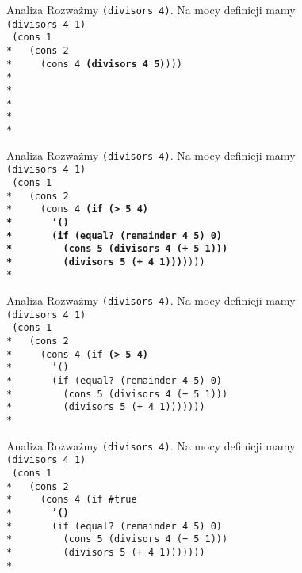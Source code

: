\begin{frame}{Analiza}
  Rozważmy \texttt{(divisors 4)}. Na mocy definicji mamy\\
  \texttt{(divisors 4 1)}\\
  \texttt{
(cons 1 \\*
\ \ (cons 2 \\*
\ \ \ \ (cons 4 \textbf{(divisors 4 5)})))\\*
\ \\*
\ \\*
\ \\*
\ \\*
  }
\end{frame}

\begin{frame}{Analiza}
  Rozważmy \texttt{(divisors 4)}. Na mocy definicji mamy\\
  \texttt{(divisors 4 1)}\\
  \texttt{
(cons 1 \\*
\ \ (cons 2 \\*
\ \ \ \ (cons 4 \textbf{(if (> 5 4)\\*
\ \ \ \ \ \ '()\\*
\ \ \ \ \ \ (if (equal?\ (remainder 4 5) 0)\\*
\ \ \ \ \ \ \ \ (cons 5 (divisors 4 (+ 5 1)))\\*
\ \ \ \ \ \ \ \ (divisors 5 (+ 4 1))))})))\\*
  }
\end{frame}

\begin{frame}{Analiza}
  Rozważmy \texttt{(divisors 4)}. Na mocy definicji mamy\\
  \texttt{(divisors 4 1)}\\
  \texttt{
(cons 1 \\*
\ \ (cons 2 \\*
\ \ \ \ (cons 4 (if \textbf{(> 5 4)}\\*
\ \ \ \ \ \ '()\\*
\ \ \ \ \ \ (if (equal?\ (remainder 4 5) 0)\\*
\ \ \ \ \ \ \ \ (cons 5 (divisors 4 (+ 5 1)))\\*
\ \ \ \ \ \ \ \ (divisors 5 (+ 4 1)))))))\\*
  }
\end{frame}

\begin{frame}{Analiza}
  Rozważmy \texttt{(divisors 4)}. Na mocy definicji mamy\\
  \texttt{(divisors 4 1)}\\
  \texttt{
(cons 1 \\*
\ \ (cons 2 \\*
\ \ \ \ (cons 4 (if \#true\\*
\ \ \ \ \ \ \textbf{'()}\\*
\ \ \ \ \ \ (if (equal?\ (remainder 4 5) 0)\\*
\ \ \ \ \ \ \ \ (cons 5 (divisors 4 (+ 5 1)))\\*
\ \ \ \ \ \ \ \ (divisors 5 (+ 4 1)))))))\\*
  }
\end{frame}

